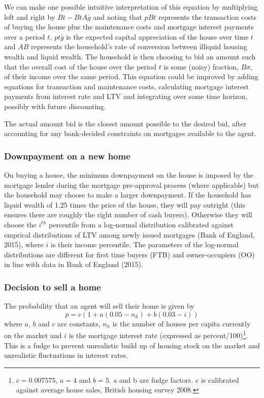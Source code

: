 \documentclass{report}
\begin{document}
We can make one possible intuitive interpretation of this equation by multiplying left and right by $Bt-BtA\bar{g}$ and noting that $pBt$ represents the transaction costs of buying the house plus the maintenance costs and mortgage interest payments over a period $t$, $pt\bar{g}$ is the expected capital appreciation of the house over time $t$ and $AB$ represents the household's rate of conversion between illiquid housing wealth and liquid wealth. The household is then choosing to bid an amount such that the overall cost of the house over the period $t$ is some (noisy) fraction, $B\sigma$, of their income over the same period. This equation could be improved by adding equations for transaction and maintenance costs, calculating mortgage interest payments from interest rate and LTV and integrating over some time horizon, possibly with future discounting.

The actual amount bid is the closest amount possible to the desired bid, after accounting for any bank-decided constraints on mortgages available to the agent.

\subsubsection{Downpayment on a new home}
\label{downpayment}
On buying a house, the minimum downpayment on the house is imposed by the mortgage lender during the mortgage pre-approval process (where applicable) but the household may choose to make a larger downpayment. If the household has liquid wealth of 1.25 times the price of the house, they will pay outright (this ensures there are roughly the right number of cash buyers). Otherwise they will choose the $i^{th}$ percentile from a log-normal distribution calibrated against emprical distributions of LTV among newly issued mortgages (Bank of England, 2015), where $i$ is their income percentile. The parameters of the log-normal distributions are different for first time buyers (FTB) and owner-occupiers (OO) in line with data in Bank of England (2015).

\subsubsection{Decision to sell a home}
The probability that an agent will sell their home is given by
\begin{equation}
p = c(1 + a(0.05-n_h) + b(0.03-i))
\label{sellhome}
\end{equation}
where $a$, $b$ and $c$ are constants, $n_h$ is the number of houses per capita currently on the market and $i$ is the mortgage interest rate (expressed as percent/100)\footnote{$c=0.007575$, $a=4$ and $b=5$. a and b are fudge factors. c is calibrated against average house sales, British housing survey 2008.}. This is a fudge to prevent unrealistic build up of housing stock on the market and unrealistic fluctuations in interest rates.
\end{document}

